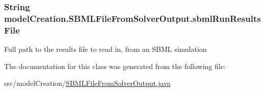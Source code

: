 \subsubsection[{sbml\+Run\+Results\+File}]{\setlength{\rightskip}{0pt plus 5cm}String model\+Creation.\+S\+B\+M\+L\+File\+From\+Solver\+Output.\+sbml\+Run\+Results\+File}\label{classmodelCreation_1_1SBMLFileFromSolverOutput_a576ec90f937bd27a6eeb5412cf703982}
Full path to the results file to read in, from an S\+B\+M\+L simulation 

The documentation for this class was generated from the following file\+:\begin{DoxyCompactItemize}
\item 
src/model\+Creation/\hyperlink{SBMLFileFromSolverOutput_8java}{S\+B\+M\+L\+File\+From\+Solver\+Output.\+java}\end{DoxyCompactItemize}
